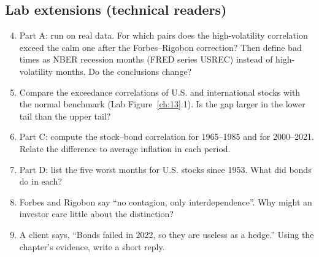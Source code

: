 \subsection*{Lab extensions (technical readers)}

\begin{enumerate}
  \setcounter{enumi}{3}
  \item Part A: run on real data. For which pairs does the high-volatility correlation exceed the calm one after the Forbes--Rigobon correction? Then define bad times as NBER recession months (FRED series USREC) instead of high-volatility months. Do the conclusions change?
  \item Compare the exceedance correlations of U.S. and international stocks with the normal benchmark (Lab Figure~\ref{ch:13}.1). Is the gap larger in the lower tail than the upper tail?
  \item Part C: compute the stock--bond correlation for 1965--1985 and for 2000--2021. Relate the difference to average inflation in each period.
  \item Part D: list the five worst months for U.S. stocks since 1953. What did bonds do in each?
  \item Forbes and Rigobon say ``no contagion, only interdependence''. Why might an investor care little about the distinction?
  \item A client says, ``Bonds failed in 2022, so they are useless as a hedge.'' Using the chapter's evidence, write a short reply.
\end{enumerate}
